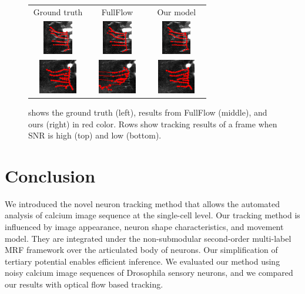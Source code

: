 \documentclass{article}
\begin{document}
\begin{figure}[b!]
	\vspace{-10pt}
	\centering
	\begin{tabular}{ccc} 
		\footnotesize{Ground truth} & \footnotesize{FullFlow} & \footnotesize{Our model} \vspace{-2pt} \\
		{\includegraphics[height=1.5cm,width=2.3cm]{img/gt_n3a.png}} &
		{\includegraphics[height=1.5cm,width=2.3cm]{img/ff_n3a.png}} &
		{\includegraphics[height=1.5cm,width=2.3cm]{img/our_n3a.png}}  \\
		{\includegraphics[height=1.5cm,width=2.3cm]{img/gt_n3b.png}} &
		{\includegraphics[height=1.5cm,width=2.3cm]{img/ff_n3b.png}} &
		{\includegraphics[height=1.5cm,width=2.3cm]{img/our_n3b.png}}  \\
	\end{tabular}
	\vspace{-10pt}
	\caption{\small{shows the ground truth (left), results from FullFlow (middle), and ours (right) in red color. Rows show tracking results of a frame when SNR is high (top) and low (bottom).}}
	\label{fig:neuroncompare}
	\vspace{-10pt}
\end{figure}


\section{Conclusion}
\label{sec:ref}
We introduced the novel neuron tracking method that allows the automated analysis of calcium image sequence at the single-cell level. Our tracking method is influenced by image appearance, neuron shape characteristics, and movement model. They are integrated under the non-submodular second-order multi-label MRF framework over the articulated body of neurons. Our simplification of tertiary potential enables efficient inference. We evaluated our method using noisy calcium image sequences of Drosophila sensory neurons, and we compared our results with optical flow based tracking.
\end{document}
